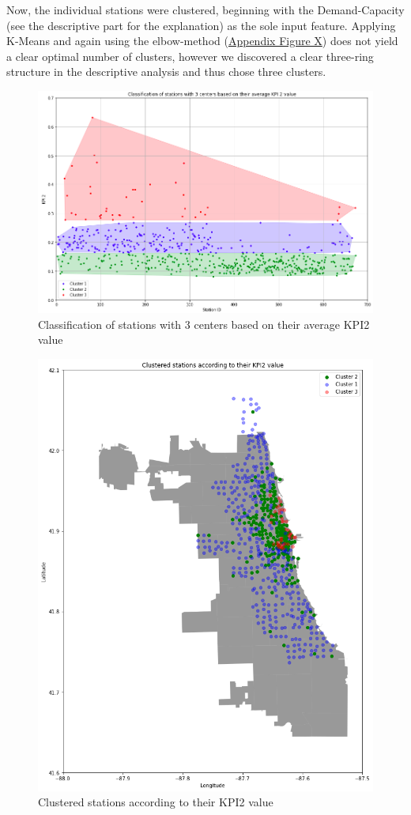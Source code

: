 Now, the individual stations were clustered, beginning with the Demand-Capacity (see the descriptive part for the explanation) as the sole input feature. Applying K-Means and again using the elbow-method (\hyperref[BCABB7]{Appendix Figure X}) does not yield a clear optimal number of clusters, however we discovered a clear three-ring structure in the descriptive analysis and thus chose three clusters. 

\begin{figure}[H]
   \centering
    \includegraphics[width=0.8\linewidth]{./Figures/BC_ABB8.png}
    \caption{Classification of stations with 3 centers based on their average KPI2 value}
    \label{BCABB8}
\end{figure}

\begin{figure}[H]
   \centering
    \includegraphics[width=0.75\linewidth]{./Figures/BC_ABB9.png}
    \caption{Clustered stations according to their KPI2 value}
    \label{BCABB9}
\end{figure}

